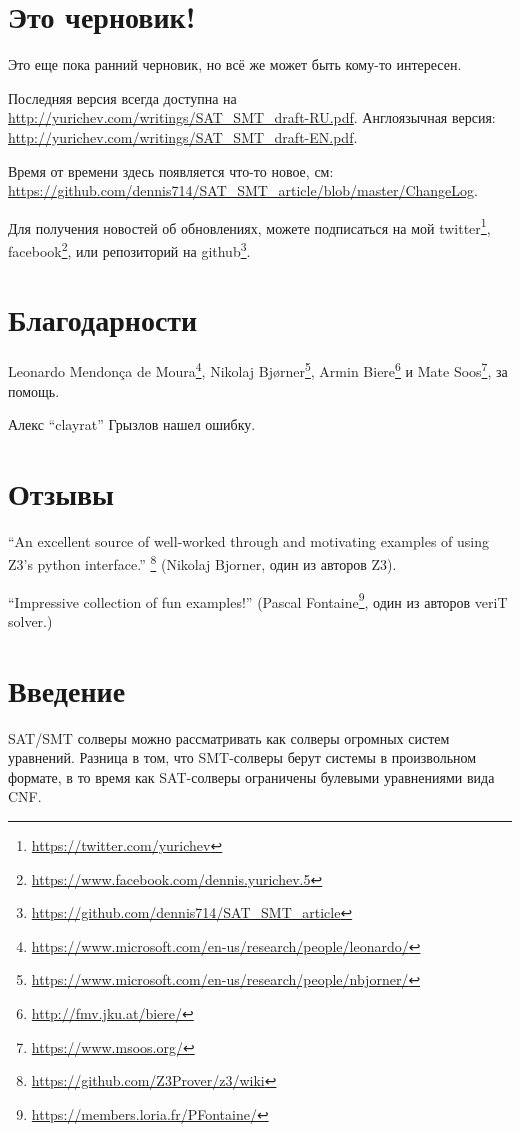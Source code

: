 \section{Это черновик!}

Это еще пока ранний черновик, но всё же может быть кому-то интересен.

Последняя версия всегда доступна на \url{http://yurichev.com/writings/SAT_SMT_draft-RU.pdf}.
Англоязычная версия: \url{http://yurichev.com/writings/SAT_SMT_draft-EN.pdf}.

Время от времени здесь появляется что-то новое, см: \url{https://github.com/dennis714/SAT_SMT_article/blob/master/ChangeLog}.

Для получения новостей об обновлениях, можете подписаться на мой
twitter\footnote{\url{https://twitter.com/yurichev}}, 
facebook\footnote{\url{https://www.facebook.com/dennis.yurichev.5}}, 
или репозиторий на github\footnote{\url{https://github.com/dennis714/SAT_SMT_article}}.

\section{Благодарности}

Leonardo Mendonça de Moura\footnote{\url{https://www.microsoft.com/en-us/research/people/leonardo/}},
Nikolaj Bjørner\footnote{\url{https://www.microsoft.com/en-us/research/people/nbjorner/}},
Armin Biere\footnote{\url{http://fmv.jku.at/biere/}} и
Mate Soos\footnote{\url{https://www.msoos.org/}},
за помощь.

Алекс ``clayrat'' Грызлов нашел ошибку.

\section{Отзывы}

``An excellent source of well-worked through and motivating examples of using Z3's python interface.''
\footnote{\url{https://github.com/Z3Prover/z3/wiki}}
(Nikolaj Bjorner, один из авторов Z3).

``Impressive collection of fun examples!''
(Pascal Fontaine\footnote{\url{https://members.loria.fr/PFontaine/}}, один из авторов veriT solver.)

\section{Введение}

\ac{SAT}/\ac{SMT} солверы можно рассматривать как солверы огромных систем уравнений.
Разница в том, что \ac{SMT}-солверы берут системы в произвольном формате,
в то время как \ac{SAT}-солверы ограничены булевыми уравнениями вида \ac{CNF}.

